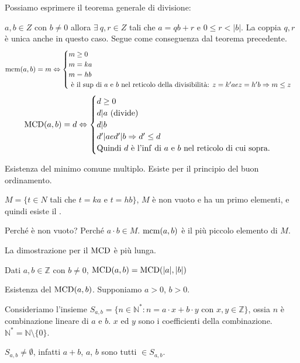 Possiamo esprimere il teorema generale di divisione:

$a, b \in Z$ con $b \neq 0$ allora $\exists \ q, r \in Z$ tali che $a = q b + r$ e $0 \le r < |b|$. La coppia $q, r$ \`e unica anche in questo caso. Segue come conseguenza dal teorema precedente. 
\[
\operatorname{mcm}(a,b) = m 
\Leftrightarrow
\begin{cases}
m \ge 0 \\
m = k a \\
m = h b \\
\text{ \`e il $\sup$ di $a$ e $b$ nel reticolo della divisibilit\`a: } z = k' a e z = h' b \Rightarrow m \le z
\end{cases}
\]
\[
\operatorname{MCD}(a,b) = d
\Leftrightarrow
\begin{cases}
d \ge 0 \\
d | a \text{ (divide)} \\
d | b \\
d' | a e d' | b \Rightarrow d' \le d \\
\text{Quindi $d$ \`e l'$\inf$ di $a$ e $b$ nel reticolo di cui sopra.}
\end{cases}
\]

Esistenza del minimo comune multiplo. Esiste per il principio del buon ordinamento.

$M = \{ t \in N$ tali che $t = k a$ e $t = h b \}$, $M$ \`e non vuoto e ha un primo elementi, e quindi esiste il \mcm.

Perch\'e \`e non vuoto? Perch\'e $a \cdot b \in M$. $\operatorname{mcm}(a,b)$ \`e il pi\`u piccolo elemento di $M$.

La dimostrazione per il $\operatorname{MCD}$ \`e pi\`u lunga.

Dati $a, b \in \mathbb{Z}$ con $b \neq 0$, $\operatorname{MCD}(a, b) = \operatorname{MCD}(|a|, |b|)$

Esistenza del $\operatorname{MCD}(a, b)$. Supponiamo $a > 0$, $b > 0$.

Consideriamo l'insieme $S_{a, b} = \{ n \in \mathbb{N}^{\ast} : n = a \cdot x + b \cdot y$ con $x, y \in \mathbb{Z}\}$, ossia $n$ \`e combinazione lineare di $a$ e $b$. $x$ ed $y$ sono i coefficienti della combinazione. $\mathbb{N}^{\ast} = \mathbb{N} \setminus \{ 0 \}$.

$S_{a, b} \neq \emptyset$, infatti $a+b$, $a$, $b$ sono tutti $\in S_{a,b}$.

